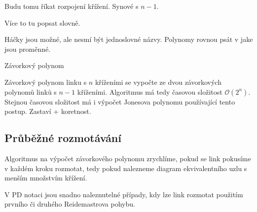 Budu tomu říkat rozpojení křížení. Synové s $n-1$.

Více to tu popsat slovně.

Háčky jsou možné, ale nesmí být jednoslovné názvy.
Polynomy rovnou psát v jake jsou proměnné.

\begin{algorithm}[H]

\DontPrintSemicolon

%




\caption{Závorkový polynom} 
\end{algorithm}

Závorkový polynom linku s $n$ kříženími se vypočte ze dvou závorkových polynomů linků s $n-1$ kříženími. Algoritmus má tedy časovou složitost $\mathcal{O}(2^n)$. Stejnou časovou složitost má i výpočet Jonesova polynomu používající tento postup.
Zastaví + koretnost.


\subsection{Průběžné rozmotávání}
Algoritmus na výpočet závorkového polynomu zrychlíme, pokud se link pokusíme v každém kroku rozmotat, tedy pokud nalezneme diagram ekvivalentního uzlu s menším množstvím křížení. 

V PD notaci jsou snadno naleznutelné případy, kdy lze link rozmotat použitím prvního či druhého Reidemastrova pohybu.

